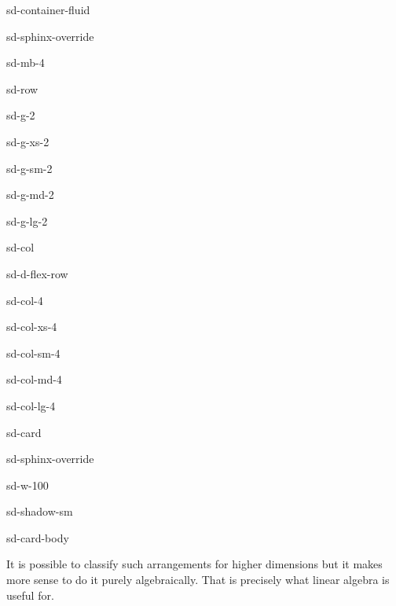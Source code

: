 \documentclass[letterpaper,10pt,english]{jupyterBook}
\begin{document}
\begin{sphinxuseclass}{sd-container-fluid}
\begin{sphinxuseclass}{sd-sphinx-override}
\begin{sphinxuseclass}{sd-mb-4}
\begin{sphinxuseclass}{sd-row}
\begin{sphinxuseclass}{sd-g-2}
\begin{sphinxuseclass}{sd-g-xs-2}
\begin{sphinxuseclass}{sd-g-sm-2}
\begin{sphinxuseclass}{sd-g-md-2}
\begin{sphinxuseclass}{sd-g-lg-2}
\begin{sphinxuseclass}{sd-col}
\begin{sphinxuseclass}{sd-d-flex-row}
\begin{sphinxuseclass}{sd-col-4}
\begin{sphinxuseclass}{sd-col-xs-4}
\begin{sphinxuseclass}{sd-col-sm-4}
\begin{sphinxuseclass}{sd-col-md-4}
\begin{sphinxuseclass}{sd-col-lg-4}
\begin{sphinxuseclass}{sd-card}
\begin{sphinxuseclass}{sd-sphinx-override}
\begin{sphinxuseclass}{sd-w-100}
\begin{sphinxuseclass}{sd-shadow-sm}
\begin{sphinxuseclass}{sd-card-body}
\end{sphinxuseclass}
\end{sphinxuseclass}
\end{sphinxuseclass}
\end{sphinxuseclass}
\end{sphinxuseclass}
\end{sphinxuseclass}
\end{sphinxuseclass}
\end{sphinxuseclass}
\end{sphinxuseclass}
\end{sphinxuseclass}
\end{sphinxuseclass}
\end{sphinxuseclass}
\end{sphinxuseclass}
\end{sphinxuseclass}
\end{sphinxuseclass}
\end{sphinxuseclass}
\end{sphinxuseclass}
\end{sphinxuseclass}
\end{sphinxuseclass}
\end{sphinxuseclass}
\end{sphinxuseclass}
\sphinxAtStartPar
It is possible to classify such arrangements for higher dimensions \sphinxhyphen{} but it makes more sense to do it purely algebraically. That is precisely what linear algebra is useful for.
\label{_pages/4.2_Planes:intersecting-planes-example}
\end{document}
